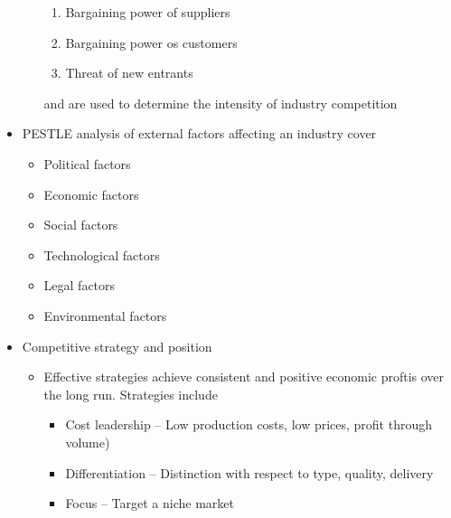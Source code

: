 \documentclass[../notes_compiled.tex]{subfiles}
\begin{document}
\begin{itemize}
\begin{itemize}
\begin{enumerate}
\item Bargaining power of suppliers
\item Bargaining power os customers
\item Threat of new entrants 
\end{enumerate}
and are used to determine the intensity of industry competition
\end{itemize}
\item PESTLE analysis of external factors affecting an industry cover
\begin{itemize}
\item Political factors
\item Economic factors
\item Social factors
\item Technological factors
\item Legal factors
\item Environmental factors
\end{itemize}
\item Competitive strategy and position
\begin{itemize}
\item Effective strategies achieve consistent and positive economic proftis over the long run. Strategies include
\begin{itemize}
\item Cost leadership -- Low production costs, low prices, profit through volume)
\item Differentiation -- Distinction with respect to type, quality, delivery
\item Focus -- Target a niche market
\end{itemize}
\end{itemize}
\end{itemize}
\end{document}
